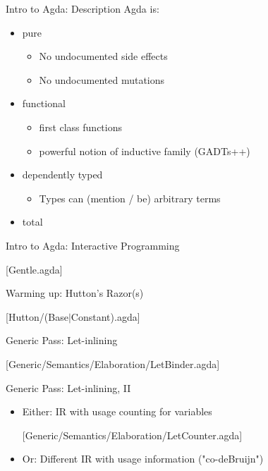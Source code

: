 \documentclass{beamer}
\newcommand{\codehere}[1]{
\begin{center}
{\large[#1.agda]}
\end{center}
}
\begin{document}
\begin{frame}{Intro to Agda: Description}
Agda is:
\begin{itemize}
  \item pure
    \begin{itemize}
      \item No undocumented side effects
      \item No undocumented mutations
    \end{itemize}
  \item functional
    \begin{itemize}
      \item first class functions
      \item powerful notion of inductive family (GADTs++)
    \end{itemize}
  \item dependently typed
    \begin{itemize}
      \item Types can (mention / be) arbitrary terms
    \end{itemize}
  \item<1> total
\end{itemize}

\end{frame}

\begin{frame}{Intro to Agda: Interactive Programming}
\codehere{Gentle}
\end{frame}

\begin{frame}{Warming up: Hutton's Razor(s)}
\codehere{Hutton/(Base$|$Constant)}
\end{frame}

\begin{frame}{Generic Pass: Let-inlining}
\codehere{Generic/Semantics/Elaboration/LetBinder}
\end{frame}

\begin{frame}{Generic Pass: Let-inlining, II}
\begin{itemize}
  \item Either: IR with usage counting for variables
    \codehere{Generic/Semantics/Elaboration/LetCounter}

  \item Or: Different IR with usage information ("co-deBruijn")
\end{itemize}
\end{frame}
\end{document}
